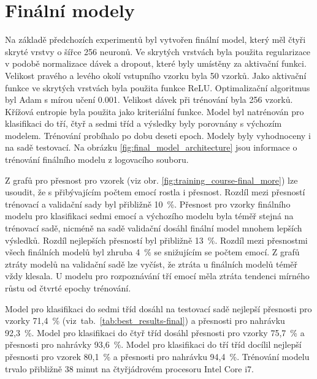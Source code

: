 \documentclass[FM,BP]{tulthesis}
\begin{document}
\section{Finální modely} %
Na základě předchozích experimentů byl vytvořen finální model, který měl čtyři skryté vrstvy o šířce 256 neuronů. Ve skrytých vrstvách byla použita regularizace v podobě normalizace dávek a dropout, které byly umístěny za aktivační funkci. Velikost pravého a levého okolí vstupního vzorku byla 50 vzorků. Jako aktivační funkce ve skrytých vrstvách byla použita funkce ReLU. Optimalizační algoritmus byl Adam s mírou učení 0.001. Velikost dávek při trénování byla 256 vzorků. Křížová entropie byla použita jako kriteriální funkce. Model byl natrénován pro klasifikaci do tří, čtyř a sedmi tříd a výsledky byly porovnány s výchozím modelem. Trénování probíhalo po dobu deseti epoch. Modely byly vyhodnoceny i na sadě testovací. Na obrázku \ref{fig:final_model_architecture} jsou informace o trénování finálního modelu z logovacího souboru.

Z grafů pro přesnost pro vzorek (viz obr. \mbox{\ref{fig:training_course-final_more}}) lze usoudit, že s přibývajícím počtem emocí rostla i přesnost. Rozdíl mezi přesností trénovací a validační sady byl přibližně \mbox{10 \%}. Přesnost pro vzorky finálního modelu pro klasifikaci sedmi emocí a výchozího modelu byla téměř stejná na trénovací sadě, nicméně na sadě validační dosáhl finální model mnohem lepších výsledků. Rozdíl nejlepších přesností byl přibližně \mbox{13 \%}. Rozdíl mezi přesnostmi všech finálních modelů byl zhruba \mbox{4 \%} se snižujícím se počtem emocí. Z grafů ztráty modelů na validační sadě lze vyčíst, že ztráta u finálních modelů téměř vždy klesala. U modelu pro rozpoznávání tří emocí měla ztráta tendenci mírného růstu od čtvrté epochy trénování.

Model pro klasifikaci do sedmi tříd dosáhl na testovací sadě nejlepší přesnosti pro vzorky \mbox{71,4 \%} \mbox{(viz tab. \ref{tab:best_results-final})} a přesnosti pro nahrávku \mbox{92,3 \%}. Model pro klasifikaci do čtyř tříd dosáhl přesnosti pro vzorky \mbox{75,7 \%} a přesnosti pro nahrávky \mbox{93,6 \%}. Model pro klasifikaci do tří tříd docílil nejlepší přesnosti pro vzorek \mbox{80,1 \%} a přesnosti pro nahrávku \mbox{94,4 \%}. Trénování modelu trvalo přibližně 38 minut na čtyřjádrovém procesoru Intel Core i7.
\end{document}
